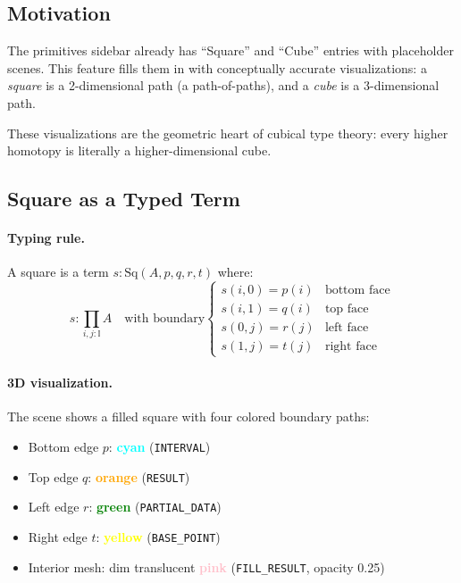 \documentclass[11pt,a4paper]{article}
\begin{document}
\subsection{Motivation}

The primitives sidebar already has ``Square'' and ``Cube'' entries with
placeholder scenes. This feature fills them in with conceptually accurate
visualizations: a \emph{square} is a 2-dimensional path (a path-of-paths), and
a \emph{cube} is a 3-dimensional path.

These visualizations are the geometric heart of cubical type theory: every
higher homotopy is literally a higher-dimensional cube.

\subsection{Square as a Typed Term}

\paragraph{Typing rule.}
A square is a term $s : \mathrm{Sq}(A,p,q,r,t)$ where:
\[
  s : \prod_{i,j:\mathbb{I}} A \quad \text{with boundary}
  \begin{cases}
    s(i,0) = p(i) & \text{bottom face} \\
    s(i,1) = q(i) & \text{top face} \\
    s(0,j) = r(j) & \text{left face} \\
    s(1,j) = t(j) & \text{right face}
  \end{cases}
\]

\paragraph{3D visualization.}
The scene shows a filled square with four colored boundary paths:
\begin{itemize}
  \item Bottom edge $p$: \textcolor{cyan}{\textbf{cyan}} (\texttt{INTERVAL})
  \item Top edge $q$: \textcolor{orange}{\textbf{orange}} (\texttt{RESULT})
  \item Left edge $r$: \textcolor{green}{\textbf{green}} (\texttt{PARTIAL\_DATA})
  \item Right edge $t$: \textcolor{yellow}{\textbf{yellow}} (\texttt{BASE\_POINT})
  \item Interior mesh: dim translucent \textcolor{pink}{\textbf{pink}}
    (\texttt{FILL\_RESULT}, opacity 0.25)
\end{itemize}
\end{document}

